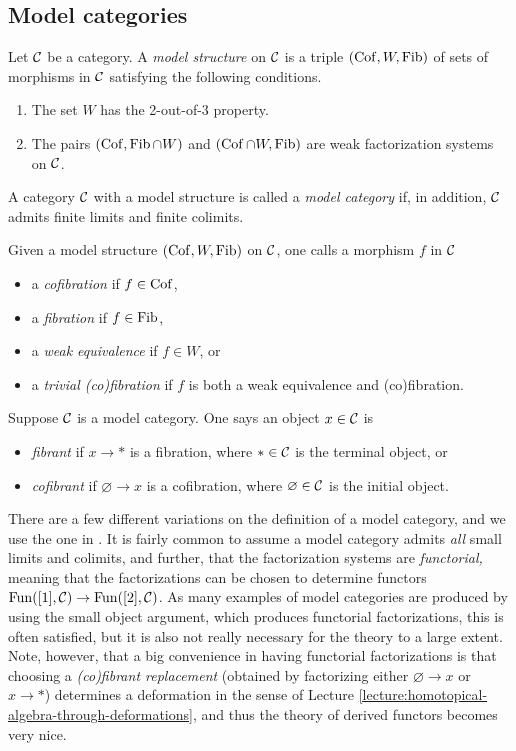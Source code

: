 \subsection{Model categories}
\begin{definition}
	Let \(\mathcal{C}\) be a category. A \emph{model structure} on \(\mathcal{C}\) is a triple \((\operatorname{Cof},W,\operatorname{Fib})\) of sets of morphisms in \(\mathcal{C}\) satisfying the following conditions.
	\begin{enumerate}[label=(\arabic*)]
		\item The set \(W\) has the 2-out-of-3 property.
		\item The pairs \((\operatorname{Cof},\operatorname{Fib}\cap W)\) and \((\operatorname{Cof}\cap W,\operatorname{Fib})\) are weak factorization systems on \(\mathcal{C}\).
	\end{enumerate}
	A category \(\mathcal{C}\) with a model structure is called a \emph{model category} if, in addition, \(\mathcal{C}\) admits finite limits and finite colimits.
\end{definition}
\begin{terminology}
	Given a model structure \((\operatorname{Cof},W,\operatorname{Fib})\) on \(\mathcal{C}\), one calls a morphism \(f\) in \(\mathcal{C}\)
	\begin{itemize}
		\item a \emph{cofibration} if \(f\in\operatorname{Cof}\),
		\item a \emph{fibration} if \(f\in\operatorname{Fib}\),
		\item a \emph{weak equivalence} if \(f\in W\), or
		\item a \emph{trivial (co)fibration} if \(f\) is both a weak equivalence and (co)fibration.
	\end{itemize}
	Suppose \(\mathcal{C}\) is a model category. One says an object \(x\in\mathcal{C}\) is
	\begin{itemize}
		\item \emph{fibrant} if \(x\to *\) is a fibration, where \(*\in\mathcal{C}\) is the terminal object, or
		\item \emph{cofibrant} if \(\varnothing\to x\) is a cofibration, where \(\varnothing\in\mathcal{C}\) is the initial object.
	\end{itemize}
\end{terminology}
\begin{remark}
	There are a few different variations on the definition of a model category, and we use the one in \cite{cisinski-book}. It is fairly common to assume a model category admits 
	\emph{all} small limits and colimits, and further, that the factorization systems are \emph{functorial,} meaning that the factorizations can be chosen
	to determine functors \(\operatorname{Fun}([1],\mathcal{C})\to\operatorname{Fun}([2],\mathcal{C})\). As many examples of model categories are produced by using the small object argument, which
	produces functorial factorizations, this is often satisfied, but it is also not really necessary for the theory to a large extent. Note, however, that
	a big convenience in having functorial factorizations is that choosing a \emph{(co)fibrant replacement} (obtained by factorizing either \(\varnothing\to x\) or \(x\to *\))
	determines a deformation in the sense of Lecture \ref{lecture:homotopical-algebra-through-deformations}, and thus the theory of derived functors becomes very nice.
\end{remark}
